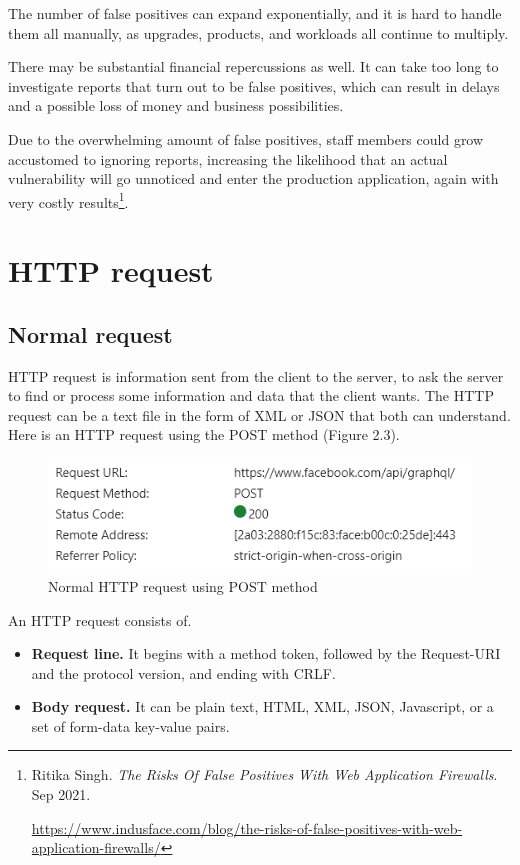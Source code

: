 The number of false positives can expand exponentially, and it is hard to handle them all manually, as upgrades, products, and workloads all continue to multiply.

There may be substantial financial repercussions as well. It can take too long to investigate reports that turn out to be false positives, which can result in delays and a possible loss of money and business possibilities.

Due to the overwhelming amount of false positives, staff members could grow accustomed to ignoring reports, increasing the likelihood that an actual vulnerability will go unnoticed and enter the production application, again with very costly results\footnote{Ritika Singh. \textit{The Risks Of False Positives With Web Application Firewalls}. Sep 2021. \raggedright\url{https://www.indusface.com/blog/the-risks-of-false-positives-with-web-application-firewalls/}}.


\section{HTTP request}
\subsection{Normal request}
\hspace{0.5cm}HTTP request is information sent from the client to the server, to ask the server to find or process some information and data that the client wants. The HTTP request can be a text file in the form of XML or JSON that both can understand. Here is an HTTP request using the POST method (Figure 2.3).
\begin{figure}[ht]
	\centering
	\includegraphics[width=\linewidth, height=3cm,keepaspectratio]{figures/normal request.png}
	\caption{Normal HTTP request using POST method}
\end{figure}

\hspace{0.5cm}An HTTP request consists of.
\begin{itemize}
	\item \textbf{Request line.} It begins with a method token, followed by the Request-URI and the protocol version, and ending with CRLF.
	\item \textbf{Body request.} It can be plain text, HTML, XML, JSON, Javascript, or a set of form-data key-value pairs.
\end{itemize}

